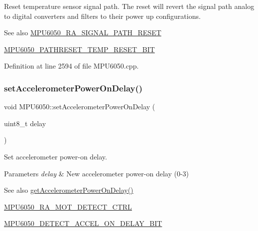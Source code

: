 Reset temperature sensor signal path. The reset will revert the signal path analog to digital converters and filters to their power up configurations. \begin{DoxySeeAlso}{See also}
\mbox{\hyperlink{MPU6050_8h_accbe0fc25de063494eac9fda35ed1ca5}{M\+P\+U6050\+\_\+\+R\+A\+\_\+\+S\+I\+G\+N\+A\+L\+\_\+\+P\+A\+T\+H\+\_\+\+R\+E\+S\+ET}} 

\mbox{\hyperlink{MPU6050_8h_a4ef510137ee58f16813c0326b196e5a6}{M\+P\+U6050\+\_\+\+P\+A\+T\+H\+R\+E\+S\+E\+T\+\_\+\+T\+E\+M\+P\+\_\+\+R\+E\+S\+E\+T\+\_\+\+B\+IT}} 
\end{DoxySeeAlso}


Definition at line 2594 of file M\+P\+U6050.\+cpp.


\begin{DoxyCode}{0}

\end{DoxyCode}
\mbox{\label{classMPU6050_a2bbde7653d2d2d37e16e515599f3b08b}} 
\subsubsection{\texorpdfstring{setAccelerometerPowerOnDelay()}{setAccelerometerPowerOnDelay()}}
{\footnotesize\ttfamily void M\+P\+U6050\+::set\+Accelerometer\+Power\+On\+Delay (\begin{DoxyParamCaption}\item[{uint8\+\_\+t}]{delay }\end{DoxyParamCaption})}

Set accelerometer power-\/on delay. 
\begin{DoxyParams}{Parameters}
{\em delay} & New accelerometer power-\/on delay (0-\/3) \\
\hline
\end{DoxyParams}
\begin{DoxySeeAlso}{See also}
\mbox{\hyperlink{classMPU6050_aae903df2accc687423f9cd0a78f9cd32}{get\+Accelerometer\+Power\+On\+Delay()}} 

\mbox{\hyperlink{MPU6050_8h_ae83e3eb48f0803227db54291fdf0ea80}{M\+P\+U6050\+\_\+\+R\+A\+\_\+\+M\+O\+T\+\_\+\+D\+E\+T\+E\+C\+T\+\_\+\+C\+T\+RL}} 

\mbox{\hyperlink{MPU6050_8h_a31babac49d185160595482b1a41a9db3}{M\+P\+U6050\+\_\+\+D\+E\+T\+E\+C\+T\+\_\+\+A\+C\+C\+E\+L\+\_\+\+O\+N\+\_\+\+D\+E\+L\+A\+Y\+\_\+\+B\+IT}} 
\end{DoxySeeAlso}


